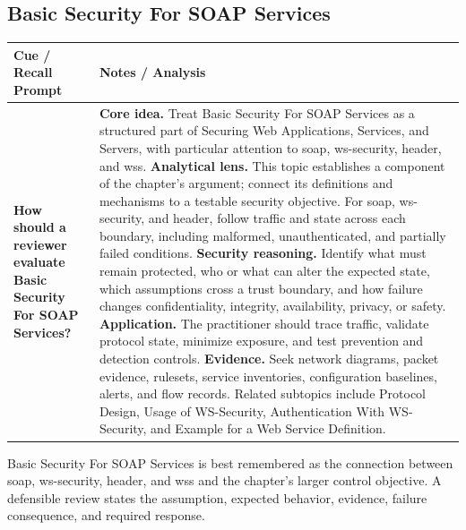 \documentclass[11pt]{article}
\newcommand{\CornellHeader}{%
\rowcolor{Navy}\color{white}\bfseries Cue / Recall Prompt & \color{white}\bfseries Notes / Analysis\\\hline}
\newcommand{\CornellRow}[2]{%
\cellcolor{CueGray}\RaggedRight\textbf{#1} & \RaggedRight #2\\\hline}
\begin{document}
\subsection*{Basic Security For SOAP Services}
\begin{longtable}{>{\RaggedRight\arraybackslash}p{}|>{\RaggedRight\arraybackslash}p{}}
\CornellHeader
\CornellRow{How should a reviewer evaluate Basic Security For SOAP Services?}{\textbf{Core idea.} Treat Basic Security For SOAP Services as a structured part of Securing Web Applications, Services, and Servers, with particular attention to soap, ws-security, header, and wss. \textbf{Analytical lens.} This topic establishes a component of the chapter's argument; connect its definitions and mechanisms to a testable security objective. For soap, ws-security, and header, follow traffic and state across each boundary, including malformed, unauthenticated, and partially failed conditions. \textbf{Security reasoning.} Identify what must remain protected, who or what can alter the expected state, which assumptions cross a trust boundary, and how failure changes confidentiality, integrity, availability, privacy, or safety. \textbf{Application.} The practitioner should trace traffic, validate protocol state, minimize exposure, and test prevention and detection controls. \textbf{Evidence.} Seek network diagrams, packet evidence, rulesets, service inventories, configuration baselines, alerts, and flow records. Related subtopics include Protocol Design, Usage of WS-Security, Authentication With WS-Security, and Example for a Web Service Definition.}
\end{longtable}
\begin{topicsummary}
Basic Security For SOAP Services is best remembered as the connection between soap, ws-security, header, and wss and the chapter's larger control objective. A defensible review states the assumption, expected behavior, evidence, failure consequence, and required response.
\end{topicsummary}
\end{document}
